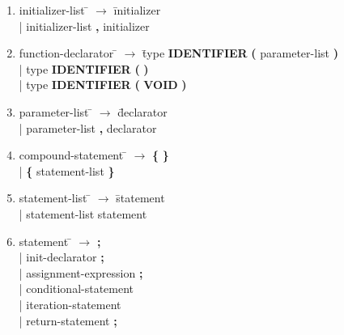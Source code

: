 \documentclass[12pt]{article}
\begin{document}
\begin{enumerate}
\item \begin{tabbing} initializer-list \= $\rightarrow$ \= initializer \\
	\> \hspace*{0.05cm} | \> initializer-list \textbf{,} initializer
\end{tabbing}

\item \begin{tabbing} function-declarator \= $\rightarrow$ \= type \textbf{IDENTIFIER} \textbf{(} parameter-list \textbf{)} \\
	\> \hspace*{0.05cm} | \> type \textbf{IDENTIFIER} \textbf{(} \textbf{)} \\
	\> \hspace*{0.05cm} | \> type \textbf{IDENTIFIER} \textbf{(} \textbf{VOID} \textbf{)}
\end{tabbing}

\item \begin{tabbing} parameter-list \= $\rightarrow$ \= declarator \\
	\> \hspace*{0.05cm} | \> parameter-list \textbf{,} declarator
\end{tabbing}

\item \begin{tabbing} compound-statement \= $\rightarrow$ \= \textbf{\{} \textbf{\}} \\
	\> \hspace*{0.05cm} | \> \textbf{\{} statement-list \textbf{\}}
\end{tabbing}

\item \begin{tabbing} statement-list \= $\rightarrow$ \= statement \\
	\> \hspace*{0.05cm} | \> statement-list statement
\end{tabbing}

\item \begin{tabbing} statement \= $\rightarrow$ \= \textbf{;} \\
	\> \hspace*{0.05cm} | \> init-declarator \textbf{;} \\
	\> \hspace*{0.05cm} | \> assignment-expression \textbf{;} \\
	\> \hspace*{0.05cm} | \> conditional-statement \\
	\> \hspace*{0.05cm} | \> iteration-statement \\
	\> \hspace*{0.05cm} | \> return-statement \textbf{;}
\end{tabbing}


\end{enumerate}
\end{document}

